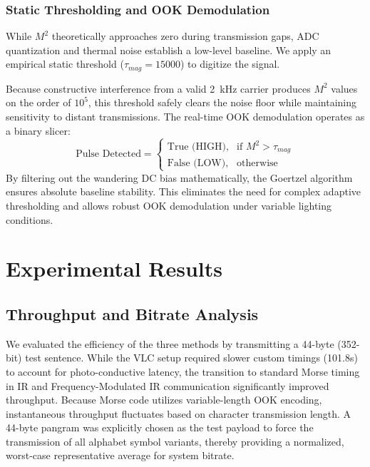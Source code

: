 \documentclass[conference]{IEEEtran}
\begin{document}
\subsubsection{Static Thresholding and OOK Demodulation}
While $M^2$ theoretically approaches zero during transmission gaps, ADC quantization and thermal noise establish a low-level baseline. We apply an empirical static threshold ($\tau_{mag} = 15000$) to digitize the signal. 

Because constructive interference from a valid 2~kHz carrier produces $M^2$ values on the order of $10^5$, this threshold safely clears the noise floor while maintaining sensitivity to distant transmissions. The real-time OOK demodulation operates as a binary slicer:
\begin{equation}
    \text{Pulse Detected} = \begin{cases} 
      \text{True (HIGH)}, & \text{if } M^2 > \tau_{mag} \\
      \text{False (LOW)}, & \text{otherwise} 
   \end{cases}
\end{equation}
By filtering out the wandering DC bias mathematically, the Goertzel algorithm ensures absolute baseline stability. This eliminates the need for complex adaptive thresholding and allows robust OOK demodulation under variable lighting conditions.

\section{Experimental Results}

\subsection{Throughput and Bitrate Analysis}
We evaluated the efficiency of the three methods by transmitting a 44-byte (352-bit) test sentence. While the VLC setup required slower custom timings (101.8s) to account for photo-conductive latency, the transition to standard Morse timing in IR and Frequency-Modulated IR communication significantly improved throughput. Because Morse code utilizes variable-length OOK encoding, instantaneous throughput fluctuates based on character transmission length. A 44-byte pangram was explicitly chosen as the test payload to force the transmission of all alphabet symbol variants, thereby providing a normalized, worst-case representative average for system bitrate.
\end{document}
